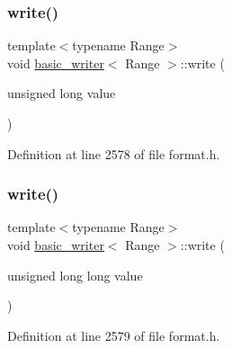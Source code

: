 \subsubsection{\texorpdfstring{write()}{write()}\hspace{0.1cm}{\footnotesize\ttfamily [5/16]}}
{\footnotesize\ttfamily template$<$typename Range$>$ \\
void \hyperlink{classbasic__writer}{basic\+\_\+writer}$<$ Range $>$\+::write (\begin{DoxyParamCaption}\item[{unsigned long}]{value }\end{DoxyParamCaption})\hspace{0.3cm}{\ttfamily [inline]}}



Definition at line 2578 of file format.\+h.

\mbox{\label{classbasic__writer_a2ba7259021f6b8dc58add730649af065}} 
\subsubsection{\texorpdfstring{write()}{write()}\hspace{0.1cm}{\footnotesize\ttfamily [6/16]}}
{\footnotesize\ttfamily template$<$typename Range$>$ \\
void \hyperlink{classbasic__writer}{basic\+\_\+writer}$<$ Range $>$\+::write (\begin{DoxyParamCaption}\item[{unsigned long long}]{value }\end{DoxyParamCaption})\hspace{0.3cm}{\ttfamily [inline]}}



Definition at line 2579 of file format.\+h.

\mbox{\label{classbasic__writer_a87b081da019e2423162de1491d62b796}} 
